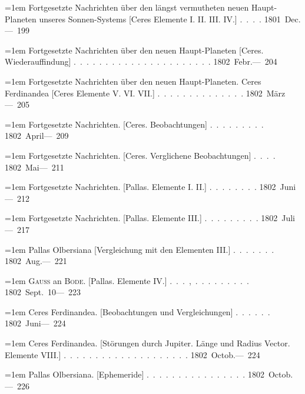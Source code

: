 \noindent\hangindent=1em Fortgesetzte Nachrichten über den längst vermutheten neuen Haupt-Planeten unseres Sonnen-Systems [Ceres Elemente I. II. III. IV.] \mbox{.\ .\ .\ .} \hfill\mbox{1801 Dec.}\quad\mbox{--- 199}\par\smallskip
\noindent\hangindent=1em Fortgesetzte Nachrichten über den neuen Haupt-Planeten [Ceres. Wiederauffindung] \mbox{.\ .\ .\ .\ .\ .\ .\ .\ .\ .\ .\ .\ .\ .\ .\ .\ .\ .\ .\ .\ .\ .} \hfill\mbox{1802 Febr.}\quad\mbox{--- 204}\par\smallskip
\noindent\hangindent=1em Fortgesetzte Nachrichten über den neuen Haupt-Planeten. Ceres Ferdinandea [Ceres Elemente V. VI. VII.] \mbox{.\ .\ .\ .\ .\ .\ .\ .\ .\ .\ .\ .\ .\ .} \hfill\mbox{1802 März}\quad\mbox{--- 205}\par\smallskip
\noindent\hangindent=1em Fortgesetzte Nachrichten. [Ceres. Beobachtungen] \mbox{.\ .\ .\ .\ .\ .\ .\ .\ .} \hfill\mbox{1802 April}\quad\mbox{--- 209}\par\smallskip
\noindent\hangindent=1em Fortgesetzte Nachrichten. [Ceres. Verglichene Beobachtungen] \mbox{.\ .\ .\ .} \hfill\mbox{1802 Mai}\quad\mbox{--- 211}\par\smallskip
\noindent\hangindent=1em Fortgesetzte Nachrichten. [Pallas. Elemente I. II.] \mbox{.\ .\ .\ .\ .\ .\ .\ .} \hfill\mbox{1802 Juni}\quad\mbox{--- 212}\par\smallskip
\noindent\hangindent=1em Fortgesetzte Nachrichten. [Pallas. Elemente III.] \mbox{.\ .\ .\ .\ .\ .\ .\ .\ .} \hfill\mbox{1802 Juli}\quad\mbox{--- 217}\par\smallskip
\noindent\hangindent=1em Pallas Olbersiana [Vergleichung mit den Elementen III.] \mbox{.\ .\ .\ .\ .\ .\ .} \hfill\mbox{1802 Aug.}\quad\mbox{--- 221}\par\smallskip
\noindent\hangindent=1em \textsc{Gauss} an \textsc{Bode}. [Pallas. Elemente IV.] \mbox{.\ .\ .\ ,\ .\ .\ .\ .\ .\ .\ .\ .\ .} \hfill\mbox{1802 Sept. 10}\quad\mbox{--- 223}\par\smallskip
\noindent\hangindent=1em Ceres Ferdinandea. [Beobachtungen und Vergleichungen] \mbox{.\ .\ .\ .\ .\ .} \hfill\mbox{1802 Juni}\quad\mbox{--- 224}\par\smallskip
\noindent\hangindent=1em Ceres Ferdinandea. [Störungen durch Jupiter. Länge und Radius Vector. Elemente VIII.] \mbox{.\ .\ .\ .\ .\ .\ .\ .\ .\ .\ .\ .\ .\ .\ .\ .\ .\ .\ .\ .} \hfill\mbox{1802 Octob.}\quad\mbox{--- 224}\par\smallskip
\noindent\hangindent=1em Pallas Olbersiana. [Ephemeride] \mbox{.\ .\ .\ .\ .\ .\ .\ .\ .\ .\ .\ .\ .\ .\ .\ .} \hfill\mbox{1802 Octob.}\quad\mbox{--- 226}\par\smallskip
